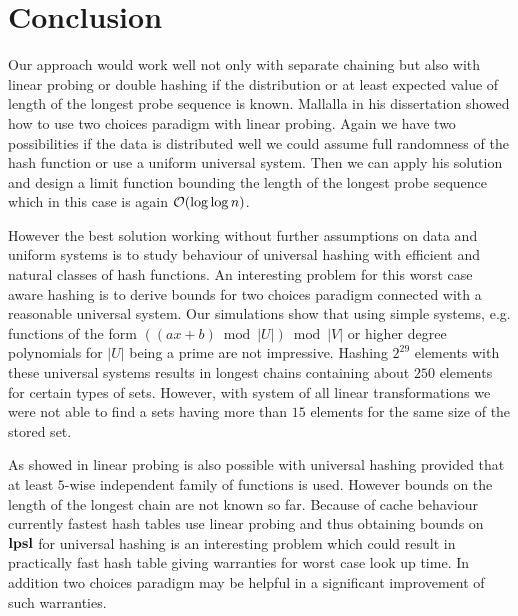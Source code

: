 \section{Conclusion}
\label{section-conclusion}
Our approach would work well not only with separate chaining but also with linear probing or double hashing if the distribution or at least expected value of length of the longest probe sequence is known. Mallalla in his dissertation \cite{mallala} showed how to use two choices paradigm with linear probing. Again we have two possibilities if the data is distributed well we could assume full randomness of the hash function or use a uniform universal system. Then we can apply his solution and design a limit function bounding the length of the longest probe sequence which in this case is again $\mathcal{O}(\log \log n)$.

However the best solution working without further assumptions on data and uniform systems is to study behaviour of universal hashing with efficient and natural classes of hash functions. An interesting  problem for this worst case aware hashing is to derive bounds for two choices paradigm connected with a reasonable universal system. Our simulations show that using simple systems, e.g. functions of the form $((ax + b) \bmod |U|) \bmod |V|$ or higher degree polynomials for $|U|$ being a prime are not impressive. Hashing $2^{29}$ elements with these universal systems results in longest chains containing about $250$ elements for certain types of sets. However, with system of all linear transformations we were not able to find a sets having more than $15$ elements for the same size of the stored set.

As showed in \cite{pagh} linear probing is also possible with universal hashing provided that at least $5$-wise independent family of functions is used. However bounds on the length of the longest chain are not known so far. Because of cache behaviour currently fastest hash tables use linear probing and thus obtaining bounds on $\mathbf{lpsl}$ for universal hashing is an interesting problem which could result in practically fast hash table giving warranties for worst case look up time. In addition two choices paradigm may be helpful in a significant improvement of such warranties.